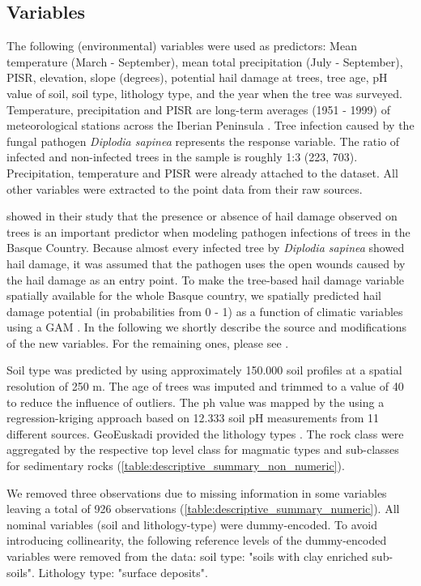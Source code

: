 \documentclass[review]{elsarticle}
\begin{document}
\subsection{Variables}

The following (environmental) variables were used as predictors: Mean temperature (March - September), mean total precipitation (July - September), \ac{PISR}, elevation, slope (degrees), potential hail damage at trees, tree age, pH value of soil, soil type, lithology type, and the year when the tree was surveyed.
Temperature, precipitation and \ac{PISR} are long-term averages (1951 - 1999) of meteorological stations across the Iberian Peninsula \citep{Ninyerola2005}.
Tree infection caused by the fungal pathogen \textit{Diplodia sapinea} represents the response variable.
The ratio of infected and non-infected trees in the sample is roughly 1:3 (223, 703).
Precipitation, temperature and PISR were already attached to the dataset.
All other variables were extracted to the point data from their raw sources.

\cite{Iturritxa2014} showed in their study that the presence or absence of hail damage observed on trees is an important predictor when modeling pathogen infections of trees in the Basque Country.
Because almost every infected tree by \textit{Diplodia sapinea} showed hail damage, it was assumed that the pathogen uses the open wounds caused by the hail damage as an entry point.
To make the tree-based hail damage variable spatially available for the whole Basque country, we spatially predicted hail damage potential (in probabilities from 0 - 1) as a function of climatic variables using a \ac{GAM} \citep{Schratz2016}.
In the following we shortly describe the source and modifications of the new variables.
For the remaining ones, please see \cite{Iturritxa2014}.

Soil type was predicted by \cite{Hengl2017} using approximately 150.000 soil profiles at a spatial resolution of 250 m.
The age of trees was imputed and trimmed to a value of 40 to reduce the influence of outliers.
The ph value was mapped by the \cite{ph} using a regression-kriging approach based on 12.333 soil pH measurements from 11 different sources.
GeoEuskadi provided the lithology types \citep{lithology}.
The rock class were aggregated by the respective top level class for magmatic types and sub-classes for sedimentary rocks \citep{Grotzinger2016} (\autoref{table:descriptive_summary_non_numeric}).

We removed three observations due to missing information in some variables leaving a total of 926 observations (\autoref{table:descriptive_summary_numeric}).
All nominal variables (soil and lithology-type) were dummy-encoded.
To avoid introducing collinearity, the following reference levels of the dummy-encoded variables were removed from the data: soil type: "soils with clay enriched sub-soils". Lithology type: "surface deposits".
\end{document}

